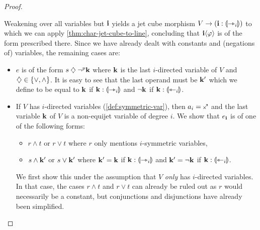 \documentclass[a4paper]{article}
\begin{document}
\begin{proof}
\begin{itemize}
\begin{itemize}
			Weakening over all variables but $\mathbf{i}$ yields a jet cube morphism $V \to (\mathbf{i} : {\llparenthesis \rightarrowtriangle_i \rrparenthesis})$ to which we can apply \cref{thm:char-jet-cube-to-line},
			concluding that $\mathbf{i} \langle \varphi \rangle$ is of the form prescribed there.
			Since we have already dealt with constants and (negations of) variables, the remaining cases are:
			\begin{itemize}
				\item $e$ is of the form $s \mathbin{\diamondsuit} \lnot^p \mathbf{k}$ where $\mathbf{k}$ is the last $i$-directed variable of $V$ and $\mathbin{\diamondsuit} \in \mathopen{}\left\{ {\vee}, {\wedge} \right\}\mathclose{}$.
				It is easy to see that the last operand must be $\mathbf{k}'$ which we define to be equal to $\mathbf{k}$ if $\mathbf{k} : {\llparenthesis \rightarrowtriangle_i \rrparenthesis}$ and $\lnot \mathbf{k}$ if $\mathbf{k} : {\llparenthesis \leftarrowtriangle_i \rrparenthesis}$.
			\end{itemize}
		\end{itemize}
		
		
		\begin{itemize}
			\item If $V$ has $i$-directed variables (\cref{def:symmetric-var}), then $a_i = \ypolar$ and the last variable $\mathbf{k}$ of $V$ is a non-equijet variable of degree $i$.
			We show that $e_{\mathbf{i}}$ is of one of the following forms:
			\begin{itemize}
				\item $r \wedge t$ or $r \vee t$ where $r$ only mentions $i$-symmetric variables,
				\item $s \wedge \mathbf{k}'$ or $s \vee \mathbf{k}'$ where $\mathbf{k}' = \mathbf{k}$ if $\mathbf{k} : {\llparenthesis \rightarrowtriangle_i \rrparenthesis}$ and $\mathbf{k}' = \lnot \mathbf{k}$ if $\mathbf{k} : {\llparenthesis \leftarrowtriangle_i \rrparenthesis}$.
			\end{itemize}
			
			We first show this under the assumption that $V$ \emph{only} has $i$-directed variables.
			In that case, the cases $r \wedge t$ and $r \vee t$ can already be ruled out as $r$ would necessarily be a constant, but conjunctions and disjunctions have already been simplified.
			

\end{itemize}
\end{itemize}
\end{proof}
\end{document}
